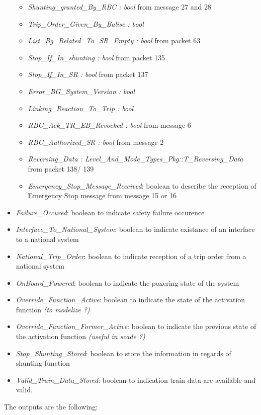 \begin{itemize}
\begin{itemize}
\item \emph{Shunting\_granted\_By\_RBC : bool} from message 27 and 28
\item \emph{Trip\_Order\_Given\_By\_Balise : bool}
\item \emph{List\_Bg\_Related\_To\_SR\_Empty : bool} from packet 63
\item \emph{Stop\_If\_In\_shunting : bool} from packet 135
\item \emph{Stop\_If\_In\_SR : bool} from packet 137
\item \emph{Error\_BG\_System\_Version : bool}
\item \emph{Linking\_Reaction\_To\_Trip : bool}
\item \emph{RBC\_Ack\_TR\_EB\_Revocked : bool} from message 6
\item \emph{RBC\_Authorized\_SR : bool} from message 2
\item \emph{Reversing\_Data : Level\_And\_Mode\_Types\_Pkg::T\_Reversing\_Data} from packet 138/ 139
\item \emph{Emergency\_Stop\_Message\_Received}: boolean to describe the reception of Emergency Stop message  from message 15 or 16
\end{itemize}
\item \emph{Failure\_Occured}: boolean to indicate safety failure occurence	
\item \emph{Interface\_To\_National\_System}: boolean to indicate existance of an interface to a national system 	  	
\item \emph{National\_Trip\_Order}: boolean to indicate reception of a trip order from a national system 	  	
\item \emph{OnBoard\_Powered}: boolean to indicate the poxering state of the system 	  	
\item \emph{Override\_Function\_Active}: boolean to indicate the state of the activation function \emph{(to modelize ?)} 	  	
\item \emph{Override\_Function\_Former\_Active}:  boolean to indicate the previous state of the activation function \emph{(useful in scade ?)} 	  	
\item \emph{Stop\_Shunting\_Stored}: boolean to store the information in regards of shunting function	  	
\item \emph{Valid\_Train\_Data\_Stored}: boolean to indication train data are available and valid.
\end{itemize}

The outputs are the following:

